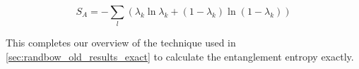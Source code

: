 \begin{equation}
S_A=-\sum_l\left(\lambda_k \ln \lambda_k+\left(1-\lambda_k\right) \ln \left(1-\lambda_k\right)\right)
\end{equation}

This completes our overview of the technique used in \ref{sec:randbow_old_results_exact} to calculate the entanglement entropy exactly.



